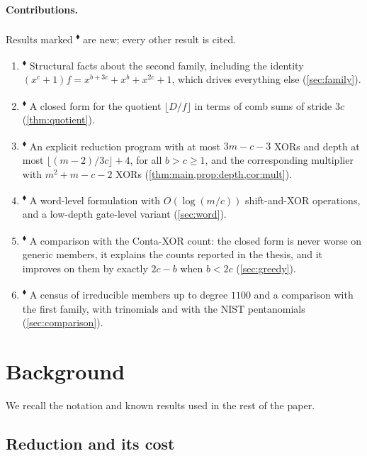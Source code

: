 \documentclass[11pt,a4paper]{article}
\theoremstyle{plain}
\theoremstyle{definition}
\newcommand{\ours}{\textsuperscript{\textcolor{cblue}{$\blacklozenge$}}}
\begin{document}
\paragraph{Contributions.}
Results marked \ours{} are new; every other result is cited.
\begin{enumerate}[leftmargin=*,itemsep=2pt]
  \item \ours{} Structural facts about the second family, including the identity
        $(x^c+1)f=x^{b+3c}+x^b+x^{2c}+1$, which drives everything else
        (\cref{sec:family}).
  \item \ours{} A closed form for the quotient $\lfloor D/f\rfloor$ in terms of comb
        sums of stride $3c$ (\cref{thm:quotient}).
  \item \ours{} An explicit reduction program with at most $3m-c-3$ XORs and depth at
        most $\lfloor(m-2)/3c\rfloor+4$, for all $b>c\ge1$, and the corresponding
        multiplier with $m^2+m-c-2$ XORs (\cref{thm:main,prop:depth,cor:mult}).
  \item \ours{} A word-level formulation with $O(\log(m/c))$ shift-and-XOR operations,
        and a low-depth gate-level variant (\cref{sec:word}).
  \item \ours{} A comparison with the Conta-XOR count: the closed form is never worse
        on generic members, it explains the counts reported in the thesis, and it
        improves on them by exactly $2c-b$ when $b<2c$ (\cref{sec:greedy}).
  \item \ours{} A census of irreducible members up to degree $1100$ and a comparison
        with the first family, with trinomials and with the NIST pentanomials
        (\cref{sec:comparison}).
\end{enumerate}

\section{Background}\label{sec:background}

We recall the notation and known results used in the rest of the paper.

\subsection{Reduction and its cost}
\end{document}
